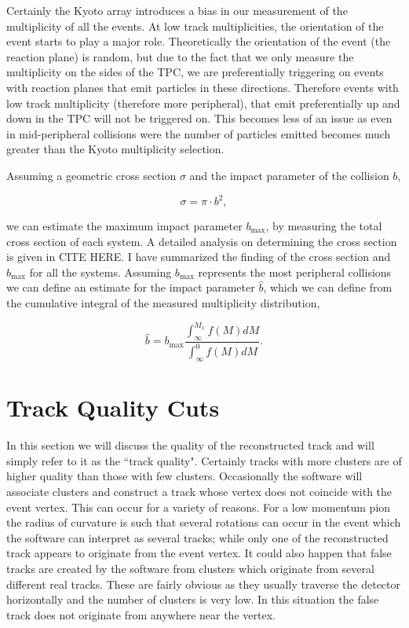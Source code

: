 Certainly the Kyoto array introduces a bias in our measurement of the multiplicity of all the events. At low track multiplicities, the orientation of the event starts to play a major role. Theoretically the orientation of the event (the reaction plane) is random, but due to the fact that we only measure the multiplicity on the sides of the TPC, we are preferentially triggering on events with reaction planes that emit particles in these directions. Therefore events with low track multiplicity (therefore more peripheral), that emit preferentially up and down in the TPC will not be triggered on. This becomes less of an issue as even in mid-peripheral collisions were the number of particles emitted becomes much greater than the Kyoto multiplicity selection. 

Assuming a geometric cross section $\sigma$ and the impact parameter of the collision $b$,

\begin{equation}
\sigma = \pi \cdot b^2,
\label{eq:crossSect}
\end{equation}

we can estimate the maximum impact parameter $b_{\mathrm{max}}$, by measuring the total cross section of each system. A detailed analysis on determining the cross section is given in CITE HERE. I have summarized the finding of the cross section and $b_{\mathrm{max}}$ for all the systems. Assuming $b_{\mathrm{max}}$ represents the most peripheral collisions we can define an estimate for the impact parameter $\hat{b}$, which we can define from the cumulative integral of the measured multiplicity distribution,

\begin{equation}
\hat{b} = b_{\mathrm{max}} \frac{\int_{\infty}^{M_x} f(M) dM}{\int_{\infty}^{0} f(M) dM}.
\end{equation}

 

\section{Track Quality Cuts}
In this section we will discuss the quality of the reconstructed track and will simply refer to it as the ``track quality". Certainly tracks with more clusters are of higher quality than those with few clusters. Occasionally the software will associate clusters and construct a track whose vertex does not coincide with the event vertex. This can occur for a variety of reasons. For a low momentum pion the radius of curvature is such that several rotations can occur in the event which the software can interpret as several tracks; while only one of the reconstructed track appears to originate from the event vertex. It could also happen that false tracks are created by the software from clusters which originate from several different real tracks. These are fairly obvious as they usually traverse the detector horizontally and the number of clusters is very low. In this situation the false track does not originate from anywhere near the vertex. 

